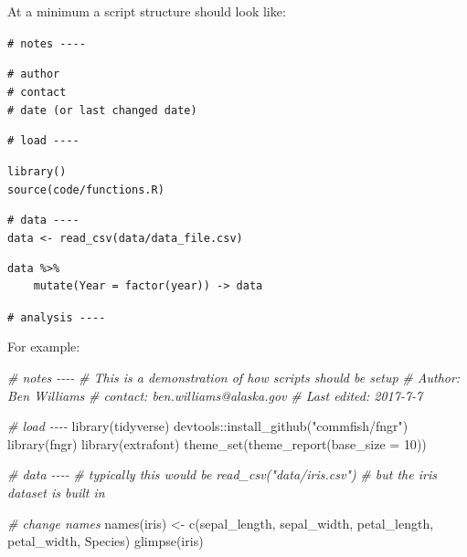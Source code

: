 \documentclass[
]{article}
\newenvironment{Shaded}{\begin{snugshade}}{\end{snugshade}}
\newcommand{\AttributeTok}[1]{\textcolor[rgb]{0.77,0.63,0.00}{#1}}
\newcommand{\CommentTok}[1]{\textcolor[rgb]{0.56,0.35,0.01}{\textit{#1}}}
\newcommand{\DecValTok}[1]{\textcolor[rgb]{0.00,0.00,0.81}{#1}}
\newcommand{\FunctionTok}[1]{\textcolor[rgb]{0.00,0.00,0.00}{#1}}
\newcommand{\NormalTok}[1]{#1}
\newcommand{\OtherTok}[1]{\textcolor[rgb]{0.56,0.35,0.01}{#1}}
\newcommand{\SpecialCharTok}[1]{\textcolor[rgb]{0.00,0.00,0.00}{#1}}
\newcommand{\StringTok}[1]{\textcolor[rgb]{0.31,0.60,0.02}{#1}}
\begin{document}
At a minimum a script structure should look like:

\texttt{\#\ notes\ -\/-\/-\/-}

\texttt{\#\ author}~\\
\texttt{\#\ contact}~\\
\texttt{\#\ date\ (or\ last\ changed\ date)}

\texttt{\#\ load\ -\/-\/-\/-}

\texttt{library()}~\\
\texttt{source(\textquotesingle{}code/functions.R\textquotesingle{})}

\texttt{\#\ data\ -\/-\/-\/-}~\\
\texttt{data\ \textless{}-\ read\_csv(\textquotesingle{}data/data\_file.csv\textquotesingle{})}

\begin{verbatim}
data %>%    
    mutate(Year = factor(year)) -> data
\end{verbatim}

\texttt{\#\ analysis\ -\/-\/-\/-}

For example:

\begin{Shaded}
\begin{Highlighting}[]
\CommentTok{\# notes {-}{-}{-}{-}}
\CommentTok{\# This is a demonstration of how scripts should be setup }
\CommentTok{\# Author: Ben Williams}
\CommentTok{\# contact: ben.williams@alaska.gov}
\CommentTok{\# Last edited: 2017{-}7{-}7}

\CommentTok{\# load {-}{-}{-}{-}  }
\FunctionTok{library}\NormalTok{(tidyverse)  }
\NormalTok{devtools}\SpecialCharTok{::}\FunctionTok{install\_github}\NormalTok{(}\StringTok{"commfish/fngr"}\NormalTok{)}
\FunctionTok{library}\NormalTok{(fngr)}
\FunctionTok{library}\NormalTok{(extrafont)}
\FunctionTok{theme\_set}\NormalTok{(}\FunctionTok{theme\_report}\NormalTok{(}\AttributeTok{base\_size =} \DecValTok{10}\NormalTok{))}


\CommentTok{\# data {-}{-}{-}{-}  }
\CommentTok{\# typically this would be read\_csv("data/iris.csv")  }
\CommentTok{\# but the iris dataset is built in  }

\CommentTok{\# change names}
\FunctionTok{names}\NormalTok{(iris) }\OtherTok{\textless{}{-}} \FunctionTok{c}\NormalTok{(}\StringTok{\textquotesingle{}sepal\_length\textquotesingle{}}\NormalTok{, }\StringTok{\textquotesingle{}sepal\_width\textquotesingle{}}\NormalTok{, }\StringTok{\textquotesingle{}petal\_length\textquotesingle{}}\NormalTok{, }\StringTok{\textquotesingle{}petal\_width\textquotesingle{}}\NormalTok{, }\StringTok{\textquotesingle{}Species\textquotesingle{}}\NormalTok{) }
\FunctionTok{glimpse}\NormalTok{(iris)}
\end{Highlighting}
\end{Shaded}
\end{document}

